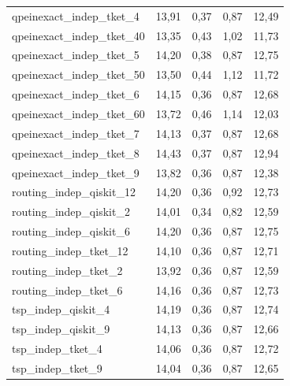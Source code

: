 \begin{longtable}{lrrrr}
qpeinexact\_indep\_tket\_4 & 13,91 & 0,37 & 0,87 & 12,49 \\
qpeinexact\_indep\_tket\_40 & 13,35 & 0,43 & 1,02 & 11,73 \\
qpeinexact\_indep\_tket\_5 & 14,20 & 0,38 & 0,87 & 12,75 \\
qpeinexact\_indep\_tket\_50 & 13,50 & 0,44 & 1,12 & 11,72 \\
qpeinexact\_indep\_tket\_6 & 14,15 & 0,36 & 0,87 & 12,68 \\
qpeinexact\_indep\_tket\_60 & 13,72 & 0,46 & 1,14 & 12,03 \\
qpeinexact\_indep\_tket\_7 & 14,13 & 0,37 & 0,87 & 12,68 \\
qpeinexact\_indep\_tket\_8 & 14,43 & 0,37 & 0,87 & 12,94 \\
qpeinexact\_indep\_tket\_9 & 13,82 & 0,36 & 0,87 & 12,38 \\
routing\_indep\_qiskit\_12 & 14,20 & 0,36 & 0,92 & 12,73 \\
routing\_indep\_qiskit\_2 & 14,01 & 0,34 & 0,82 & 12,59 \\
routing\_indep\_qiskit\_6 & 14,20 & 0,36 & 0,87 & 12,75 \\
routing\_indep\_tket\_12 & 14,10 & 0,36 & 0,87 & 12,71 \\
routing\_indep\_tket\_2 & 13,92 & 0,36 & 0,87 & 12,59 \\
routing\_indep\_tket\_6 & 14,16 & 0,36 & 0,87 & 12,73 \\
tsp\_indep\_qiskit\_4 & 14,19 & 0,36 & 0,87 & 12,74 \\
tsp\_indep\_qiskit\_9 & 14,13 & 0,36 & 0,87 & 12,66 \\
tsp\_indep\_tket\_4 & 14,06 & 0,36 & 0,87 & 12,72 \\
tsp\_indep\_tket\_9 & 14,04 & 0,36 & 0,87 & 12,65 \\
\end{longtable}
\endgroup
